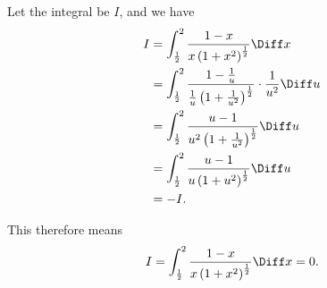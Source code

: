 \begin{enumerate}
\begin{enumerate}
                    Let the integral be \(I\), and we have
                    \begin{align*}
                        I & = \int_{\frac{1}{2}}^{2} \frac{1 - x}{x \left(1 + x^2\right)^{\frac{1}{2}}} \Diff x                                                   \\
                          & = \int_{\frac{1}{2}}^{2} \frac{1 - \frac{1}{u}}{\frac{1}{u} \left(1 + \frac{1}{u^2}\right)^{\frac{1}{2}}} \cdot \frac{1}{u^2} \Diff u \\
                          & = \int_{\frac{1}{2}}^{2} \frac{u - 1}{u^2 \left(1 + \frac{1}{u^2}\right)^{\frac{1}{2}}} \Diff u                                       \\
                          & = \int_{\frac{1}{2}}^{2} \frac{u - 1}{u \left(1 + u^2\right)^{\frac{1}{2}}} \Diff u                                                   \\
                          & = -I.
                    \end{align*}

                    This therefore means
                    \[
                        I = \int_{\frac{1}{2}}^{2} \frac{1 - x}{x \left(1 + x^2\right)^{\frac{1}{2}}} \Diff x = 0.
                    \]
          \end{enumerate}
\end{enumerate}
